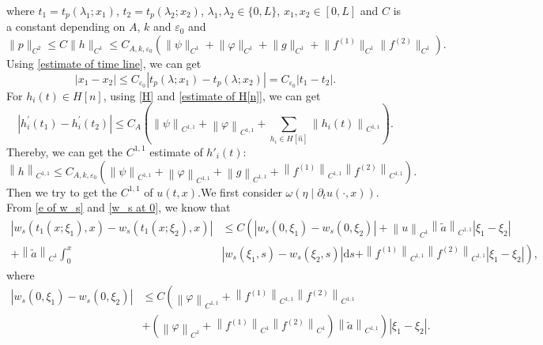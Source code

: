 \documentclass[a4paper,reqno,11pt]{amsart}
\numberwithin{equation}{section} %
\begin{document}
where $t_1=t_p(\lambda _1;x _1)$, $t_2=t_p(\lambda _2;x _2)$, $\lambda _1,\lambda _2 \in \{ 0,L \} $, $x _1,x _2 \in [0,L]$ and $C$ is a constant depending on $A$, $k$ and $\varepsilon _0$ and
$$
\|p\|_{C^2} \leq C\|h\|_{C^1} \leq C_{A,k,\varepsilon _0}(\lVert \psi \rVert _{C^1}+\lVert \varphi  \rVert _{C^1}+  \lVert g \rVert _{C^1}+\lVert f^{(1)} \rVert _{C^1}\lVert f^{(2)} \rVert _{C^1}) .
$$
Using \eqref{estimate of time line}, we can get
$$
\left| x_1-x_2 \right|\le C_{\varepsilon _0}\left| t_p\left( \lambda ;x_1 \right) -t_p\left( \lambda ;x_2 \right) \right|=C_{\varepsilon _0}\left| t_1-t_2 \right|.
$$
For $h_i(t) \in H\left[ n \right] $, using \eqref{H} and \eqref{estimate of H[n]}, we can get
$$
\left| h^{\prime }_i\left( t_1 \right) -h^{\prime }_i\left( t_2 \right) \right|\leq C_A(\left\| \psi \right\| _{C^{1,1}}+\left\| \varphi \right\| _{C^{1,1}}+\sum_{h_i\in H\left[ \hat{n} \right]}{\left\| h_i(t) \right\| _{C^{1,1}}}).
$$
Thereby, we can get the $C^{1,1}$ estimate of $h'_i(t) $:
$$
\left\| h \right\| _{C^{1,1}}\leq C_{A,k,\varepsilon _0}(\left\| \psi \right\| _{C^{1,1}}+\left\| \varphi \right\| _{C^{1,1}}+\left\| g \right\| _{C^{1,1}}+\left\| f^{(1)} \right\| _{C^{1,1}}\left\| f^{(2)} \right\| _{C^{1,1}}).
$$
Then we try to get the $C^{1,1}$ of $ u(t,x)$.We first consider $\omega \left( \eta \mid \partial _tu(\cdot ,x) \right) $.
From \eqref{e of w_s} and \eqref{w_s at 0}, we know that
$$
\begin{aligned}
\left| w_s\left( t_1\left( x;\xi _1 \right) ,x \right) -w_s\left( t_1\left( x;\xi _2 \right) ,x \right) \right| & \leq C\left( \left| w_s\left( 0,\xi _1 \right) -w_s\left( 0,\xi _2 \right) \right|+\left\| u \right\| _{C^1}\left\| \tilde{a} \right\| _{C^{1,1}}\left| \xi _1-\xi _2 \right| \right. \\
+\left\| \tilde{a} \right\| _{C^1}\int_0^x & {\left| w_s\left( \xi _1,s \right) -w_s\left( \xi _2,s \right) \right|\mathrm{d}s}  \left. +\left\| f^{\left( 1 \right)} \right\| _{C^{1,1}}\left\| f^{\left( 2 \right)} \right\| _{C^{1,1}}\left| \xi _1-\xi _2 \right| \right) ,
\end{aligned}
$$
where
$$
\begin{aligned}
	\left| w_s\left( 0,\xi _1 \right) -w_s\left( 0,\xi _2 \right) \right|& \leq  C\left( \left\| \varphi \right\| _{C^{1,1}}+\left\| f^{(1)} \right\| _{C^{1,1}}\left\| f^{(2)} \right\| _{C^{1,1}} \right.\\
	& \left. +\left( \left\| \varphi \right\| _{C^1}+\left\| f^{(1)} \right\| _{C^1}\left\| f^{(2)} \right\| _{C^1} \right) \left\| \tilde{a} \right\| _{C^{1,1}} \right) \left| \xi _1-\xi _2 \right|.
\end{aligned}
$$
\end{document}
